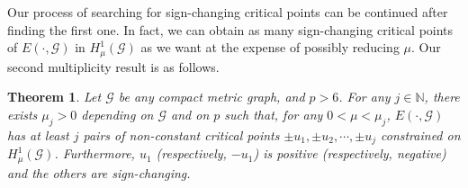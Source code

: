 \documentclass[10pt,a4paper]{article}
\newtheorem{theorem}{Theorem}[section]
\theoremstyle{definition} \theoremstyle{remark}
\numberwithin{equation}{section}
\newcommand{\G}{\mathcal{G}}
\newcommand{\N}{\mathbb{N}}
\newcommand{\B}{\mathcal{B}}
\newcommand{\p}{\mathcal{P}}
\newcommand{\la}{\lambda}
\begin{document}

Our process of searching for sign-changing critical points can be continued after finding the first one. In fact, we can obtain as many sign-changing critical points of $E(\cdot,\G)$ in $H^1_\mu(\G)$ as we want at the expense of possibly reducing $\mu$. Our second multiplicity result is as follows.

\begin{theorem} \label{thmsc2}
	Let $\G$ be any compact metric graph, and $p > 6$. For any $j \in \N$, there exists $\mu_j > 0$ depending on $\G$ and on $p$ such that, for any $0 < \mu < \mu_j$, $E(\cdot,\G)$ has at least $j$ pairs of non-constant critical points $\pm u_1, \pm u_2, \cdots, \pm u_j$ constrained on $H^1_\mu(\G)$. Furthermore, $u_1$ (respectively, $-u_1$) is positive (respectively, negative) and the others are sign-changing.
\end{theorem}
\end{document}
